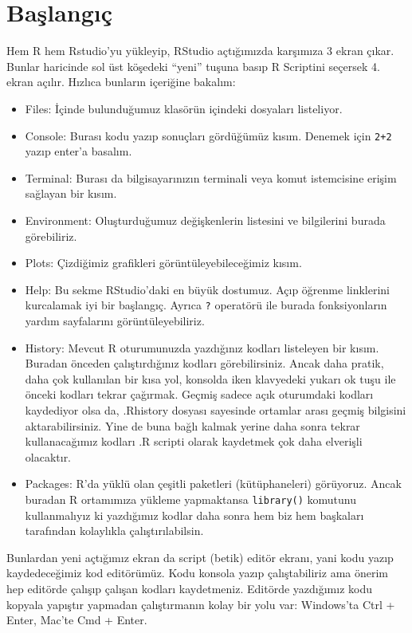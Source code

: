 \documentclass[
]{book}
\providecommand{\tightlist}{%
  \setlength{\itemsep}{0pt}\setlength{\parskip}{0pt}}
\begin{document}
\hypertarget{baux15flangux131uxe7}{%
\section{Başlangıç}\label{baux15flangux131uxe7}}

Hem R hem Rstudio'yu yükleyip, RStudio açtığımızda karşımıza 3 ekran çıkar. Bunlar haricinde sol üst köşedeki ``yeni'' tuşuna basıp R Scriptini seçersek 4. ekran açılır. Hızlıca bunların içeriğine bakalım:

\begin{itemize}
\tightlist
\item
  Files: İçinde bulunduğumuz klasörün içindeki dosyaları listeliyor.
\item
  Console: Burası kodu yazıp sonuçları gördüğümüz kısım. Denemek için \texttt{2+2} yazıp enter'a basalım.
\item
  Terminal: Burası da bilgisayarınızın terminali veya komut istemcisine erişim sağlayan bir kısım.
\item
  Environment: Oluşturduğumuz değişkenlerin listesini ve bilgilerini burada görebiliriz.
\item
  Plots: Çizdiğimiz grafikleri görüntüleyebileceğimiz kısım.
\item
  Help: Bu sekme RStudio'daki en büyük dostumuz. Açıp öğrenme linklerini kurcalamak iyi bir başlangıç. Ayrıca \texttt{?} operatörü ile burada fonksiyonların yardım sayfalarını görüntüleyebiliriz.
\item
  History: Mevcut R oturumunuzda yazdığınız kodları listeleyen bir kısım. Buradan önceden çalıştırdığınız kodları görebilirsiniz. Ancak daha pratik, daha çok kullanılan bir kısa yol, konsolda iken klavyedeki yukarı ok tuşu ile önceki kodları tekrar çağırmak. Geçmiş sadece açık oturumdaki kodları kaydediyor olsa da, .Rhistory dosyası sayesinde ortamlar arası geçmiş bilgisini aktarabilirsiniz. Yine de buna bağlı kalmak yerine daha sonra tekrar kullanacağımız kodları .R scripti olarak kaydetmek çok daha elverişli olacaktır.
\item
  Packages: R'da yüklü olan çeşitli paketleri (kütüphaneleri) görüyoruz. Ancak buradan R ortamımıza yükleme yapmaktansa \texttt{library()} komutunu kullanmalıyız ki yazdığımız kodlar daha sonra hem biz hem başkaları tarafından kolaylıkla çalıştırılabilsin.
\end{itemize}

Bunlardan yeni açtığımız ekran da script (betik) editör ekranı, yani kodu yazıp kaydedeceğimiz kod editörümüz. Kodu konsola yazıp çalıştabiliriz ama önerim hep editörde çalışıp çalışan kodları kaydetmeniz. Editörde yazdığımız kodu kopyala yapıştır yapmadan çalıştırmanın kolay bir yolu var: Windows'ta Ctrl + Enter, Mac'te Cmd + Enter.
\end{document}
